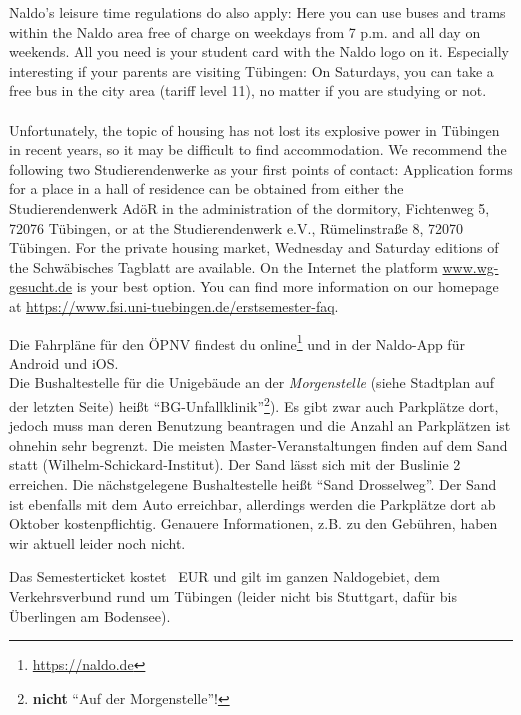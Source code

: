     Naldo's leisure time regulations do also apply: Here you can use buses and trams within the Naldo area free of charge on weekdays from 7 p.m. and all day on weekends. All you need is your student card with the Naldo logo on it.
    Especially interesting if your parents are visiting Tübingen: On Saturdays, you can take a free bus in the city area (tariff level 11), no matter if you are studying or not.\\ \\

    Unfortunately, the topic of housing has not lost its explosive power in Tübingen in recent years,
    so it may be difficult to find accommodation. We recommend the following two Studierendenwerke as your first points of contact:
    Application forms for a place in a hall of residence can be obtained from either the Studierendenwerk AdöR in the administration of the dormitory,
    Fichtenweg 5, 72076 Tübingen, or at the Studierendenwerk e.V., Rümelinstraße 8, 72070 Tübingen. For the private housing market, Wednesday and Saturday
    editions of the Schwäbisches Tagblatt are available.
    On the Internet the platform \url{www.wg-gesucht.de} is your best option.
    You can find more information on our homepage at \url{https://www.fsi.uni-tuebingen.de/erstsemester-faq}.

\else

    Die Fahrpläne für den ÖPNV  findest du online\footnote{\url{https://naldo.de}} und in der Naldo-App für Android und iOS.\\
    Die Bushaltestelle für die Unigebäude an der \emph{Morgenstelle} (siehe Stadtplan auf der letzten Seite) heißt "`BG-Unfallklinik"'\footnote{\textbf{nicht} "`Auf der Morgenstelle"'!}). Es gibt zwar auch Parkplätze dort,
    jedoch muss man deren Benutzung beantragen und die Anzahl an Parkplätzen ist ohnehin sehr begrenzt.
    \ifmaster
    Die meisten Master-Veranstaltungen finden auf dem Sand statt (Wilhelm-Schickard-Institut). Der Sand lässt sich mit der Buslinie 2 erreichen. Die nächstgelegene Bushaltestelle heißt "`Sand Drosselweg"'. Der Sand ist ebenfalls mit dem Auto erreichbar, allerdings werden die Parkplätze dort ab Oktober kostenpflichtig. Genauere Informationen, z.B. zu den Gebühren, haben wir aktuell leider noch nicht.    \fi
    
    Das Semesterticket kostet \semesterticketpreis~EUR und gilt im ganzen Naldogebiet, dem Verkehrsverbund rund um Tübingen (leider nicht bis Stuttgart, dafür bis Überlingen am Bodensee).
    
